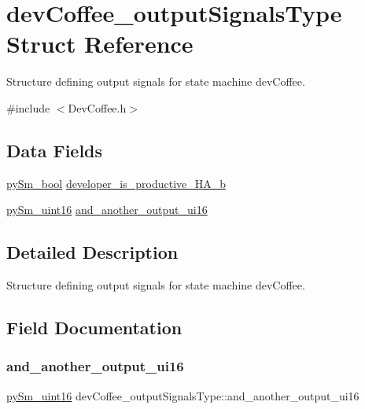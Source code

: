 \hypertarget{structdevCoffee__outputSignalsType}{}\section{dev\+Coffee\+\_\+output\+Signals\+Type Struct Reference}
\label{structdevCoffee__outputSignalsType}


Structure defining output signals for state machine dev\+Coffee.  




{\ttfamily \#include $<$Dev\+Coffee.\+h$>$}

\subsection*{Data Fields}
\begin{DoxyCompactItemize}
\item 
\hyperlink{PySm__types_8h_a368133d64634d66410f3fe1343de6ba3}{py\+Sm\+\_\+bool} \hyperlink{structdevCoffee__outputSignalsType_a6fdb1443dc1eba7693a23eef24788d26}{developer\+\_\+is\+\_\+productive\+\_\+\+H\+A\+\_\+b}
\item 
\hyperlink{PySm__types_8h_a062eb79813ba96aaea55b316b9565111}{py\+Sm\+\_\+uint16} \hyperlink{structdevCoffee__outputSignalsType_a1a5fe6d7a2b1b8f9461ce6dd2ff54194}{and\+\_\+another\+\_\+output\+\_\+ui16}
\end{DoxyCompactItemize}


\subsection{Detailed Description}
Structure defining output signals for state machine dev\+Coffee. 

\subsection{Field Documentation}
\mbox{\label{structdevCoffee__outputSignalsType_a1a5fe6d7a2b1b8f9461ce6dd2ff54194}} 
\subsubsection{\texorpdfstring{and\+\_\+another\+\_\+output\+\_\+ui16}{and\_another\_output\_ui16}}
{\footnotesize\ttfamily \hyperlink{PySm__types_8h_a062eb79813ba96aaea55b316b9565111}{py\+Sm\+\_\+uint16} dev\+Coffee\+\_\+output\+Signals\+Type\+::and\+\_\+another\+\_\+output\+\_\+ui16}

